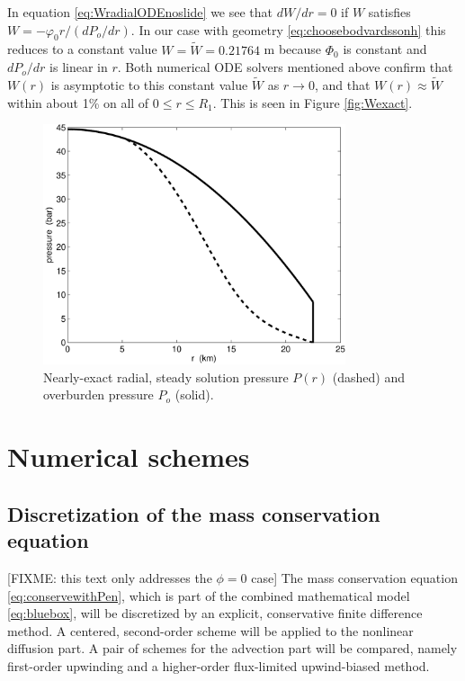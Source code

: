 \documentclass[11pt,final]{amsart}%
\begin{document}
In equation \eqref{eq:WradialODEnoslide} we see that $dW/dr=0$ if $W$ satisfies $W = - \varphi_0 r / (dP_o/dr)$.  In our case with geometry \eqref{eq:choosebodvardssonh} this reduces to a constant value $W=\tilde W= 0.21764$ m because $\Phi_0$ is constant and $dP_o/dr$ is linear in $r$.  Both numerical ODE solvers mentioned above confirm that $W(r)$ is asymptotic to this constant value $\tilde W$ as $r\to 0$, and that $W(r)\approx \tilde W$ within about 1\% on all of $0\le r \le R_1$.  This is seen in Figure \ref{fig:Wexact}.

\begin{figure}[ht]
\includegraphics[width=3.5in,keepaspectratio=true]{exact-P-plot}
\caption{Nearly-exact radial, steady solution pressure $P(r)$ (dashed) and overburden pressure $P_o$ (solid).}
\label{fig:Pexact}
\end{figure}


\section{Numerical schemes}  \label{sec:num}

\subsection*{Discretization of the mass conservation equation}  [FIXME: this text only addresses the $\phi=0$ case]  The mass conservation equation \eqref{eq:conservewithPen}, which is part of the combined mathematical model \eqref{eq:bluebox}, will be discretized by an explicit, conservative finite difference method.   A centered, second-order scheme will be applied to the nonlinear diffusion part.  A pair of schemes for the advection part will be compared, namely first-order upwinding and a higher-order flux-limited upwind-biased method.
\end{document}

